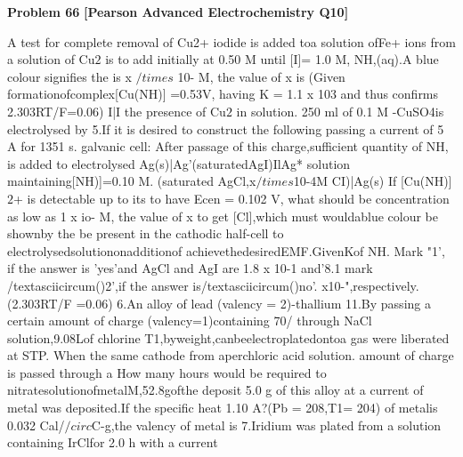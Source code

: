 \begin{problembox}
\textbf{Problem 66} \hfill \textbf{[Pearson Advanced Electrochemistry Q10]}
\label{q:ext-pearson-66}

A test for complete removal of Cu2+
iodide is added toa solution ofFe+
ions from a solution of Cu$2$ is to add
initially at 0.50 M until [I]= 1.0 M,
NH,(aq).A blue colour signifies the
is x $/times$ 10- M, the value of x is (Given
formationofcomplex[Cu(NH)]
=0.53V,
having K = 1.1 x 103 and thus confirms
2.303RT/F=0.06)
I|I
the presence of Cu$2$ in solution. 250 ml
of 0.1 M -CuSO4is electrolysed by
5.If it is desired to construct the following
passing a current of 5 A for 1351 s.
galvanic cell:
After passage of this charge,sufficient
quantity of NH, is added to electrolysed
Ag(s)|Ag'(saturatedAgI)IlAg*
solution maintaining[NH)]=0.10 M.
(saturated AgCl,x$/times$10-4M CI)|Ag(s)
If [Cu(NH)]$2$+ is detectable up to its
to have Ecen = 0.102 V, what should be
concentration as low as 1 x io- M,
the value of x to get [Cl],which must
wouldablue colour be shownby the
be present in the cathodic half-cell to
electrolysedsolutiononadditionof
achievethedesiredEMF.GivenKof
NH. Mark "1', if the answer is 'yes'and
AgCl and AgI are 1.8 x 10-1 and'8.1
mark /textasciicircum()2',if the answer is/textasciicircum()no'.
x10-",respectively.(2.303RT/F =0.06)
6.An alloy of lead (valency = 2)-thallium
11.By passing a certain amount of charge
(valency=1)containing 70/%
through NaCl solution,9.08Lof chlorine
T1,byweight,canbeelectroplatedontoa
gas were liberated at STP. When the same
cathode from aperchloric acid solution.
amount of charge is passed through a
How many hours would be required to
nitratesolutionofmetalM,52.8gofthe
deposit 5.0 g of this alloy at a current of
metal was deposited.If the specific heat
1.10 A?(Pb = 208,T1= 204)
of metalis 0.032 Cal/$/circ$C-g,the valency of
metal is
7.Iridium was plated from a solution
containing IrClfor 2.0 h with a current
\end{problembox}

